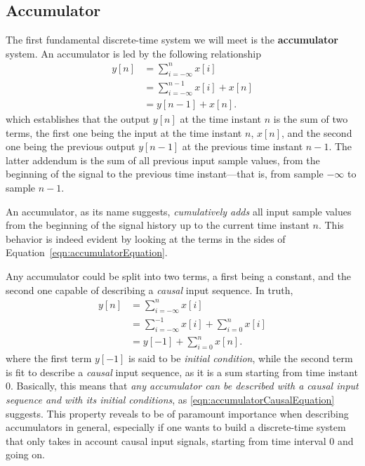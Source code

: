 \documentclass[\documentfontsize, twocolumn]{\classname}
\begin{document}
\subsection{Accumulator}

The first fundamental discrete-time system we will meet is the \textbf{accumulator} system. An accumulator is led by the following relationship
\begin{align}
    y[n] &= \sum_{i=-\infty}^{n} x[i] \\
         &= \sum_{i=-\infty}^{n-1} x[i] + x[n]\\
         &= y[n-1] + x[n].\label{eqn:accumulatorEquation}
\end{align}
which establishes that the output $y[n]$ at the time instant $n$ is the sum of two terms, the first one being the input at the time instant $n$, $x[n]$, and the second one being the previous output $y[n-1]$ at the previous time instant $n-1$. The latter addendum is the sum of all previous input sample values, from the beginning of the signal to the previous time instant---that is, from sample $-\infty$ to sample $n-1$.

An accumulator, as its name suggests, \emph{cumulatively adds} all input sample values from the beginning of the signal history up to the current time instant $n$. This behavior is indeed evident by looking at the terms in the sides of Equation~\ref{eqn:accumulatorEquation}.

Any accumulator could be split into two terms, a first being a constant, and the second one capable of describing a \emph{causal} input sequence. In truth,
\begin{align}
    y[n] &= \sum_{i=-\infty}^{n} x[i] \\
         &= \sum_{i=-\infty}^{-1} x[i] + \sum_{i=0}^{n}x[i]\\
         &= y[-1] + \sum_{i=0}^n x[n].\label{eqn:accumulatorCausalEquation}
\end{align}
where the first term $y[-1]$ is said to be \emph{initial condition}, while the second term is fit to describe a \emph{causal} input sequence, as it is a sum starting from time instant $0$. Basically, this means that \emph{any accumulator can be described with a causal input sequence and with its initial conditions}, as \ref{eqn:accumulatorCausalEquation} suggests. This property reveals to be of paramount importance when describing accumulators in general, especially if one wants to build a discrete-time system that only takes in account causal input signals, starting from time interval $0$ and going on.
\end{document}
